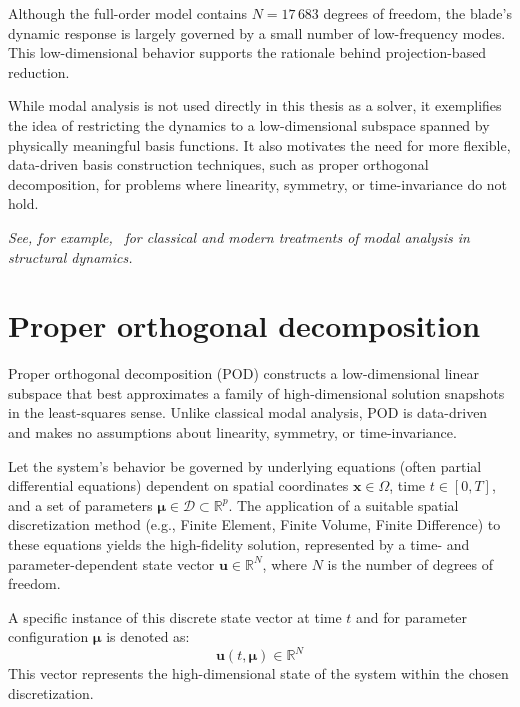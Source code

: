 Although the full-order model contains \( N = 17\,683 \) degrees of freedom, the blade's dynamic response is largely governed by a small number of low-frequency modes. This low-dimensional behavior supports the rationale behind projection-based reduction.

While modal analysis is not used directly in this thesis as a solver, it exemplifies the idea of restricting the dynamics to a low-dimensional subspace spanned by physically meaningful basis functions. It also motivates the need for more flexible, data-driven basis construction techniques, such as proper orthogonal decomposition, for problems where linearity, symmetry, or time-invariance do not hold.

\vspace{0.5em}
\textit{See, for example,}~\cite{craig2006fundamentals, meirovitch1975elements, kerschen2005method} \textit{for classical and modern treatments of modal analysis in structural dynamics.}

\section{Proper orthogonal decomposition}

Proper orthogonal decomposition (POD) constructs a low-dimensional linear subspace that best approximates a family of high-dimensional solution snapshots in the least-squares sense.  
Unlike classical modal analysis, POD is data-driven and makes no assumptions about linearity, symmetry, or time-invariance.

Let the system's behavior be governed by underlying equations (often partial differential equations) dependent on spatial coordinates $\mathbf{x} \in \Omega$, time $t \in [0, T]$, and a set of parameters $\boldsymbol{\mu} \in \mathcal{D} \subset \mathbb{R}^p$. The application of a suitable spatial discretization method (e.g., Finite Element, Finite Volume, Finite Difference) to these equations yields the high-fidelity solution, represented by a time- and parameter-dependent state vector $\mathbf{u} \in \mathbb{R}^N$, where $N$ is the number of degrees of freedom.

A specific instance of this discrete state vector at time $t$ and for parameter configuration $\boldsymbol{\mu}$ is denoted as:
\begin{equation}
\mathbf{u}(t, \boldsymbol{\mu}) \in \mathbb{R}^N
\end{equation}
This vector represents the high-dimensional state of the system within the chosen discretization.

